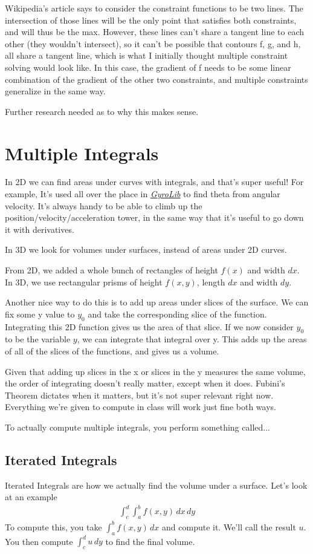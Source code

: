 \documentclass[12pt, letterpaper]{article}
\newcommand{\externalLink}[2]{\emph{\underline{\href{#1}{#2}}}}
\begin{document}
Wikipedia's article says to consider the constraint functions to be two lines.
The intersection of those lines will be the only point that satisfies both constraints, and will thus be the max.
However, these lines can't share a tangent line to each other (they wouldn't intersect), so it can't be possible that contours f, g, and h, all share a tangent line, which is what I initially thought multiple constraint solving would look like.
In this case, the gradient of f needs to be some linear combination of the gradient of the other two constraints, and multiple constraints generalize in the same way.

Further research needed as to why this makes sense.

\section{Multiple Integrals}
In 2D we can find areas under curves with integrals, and that's super useful!
For example, It's used all over the place in \externalLink{https://github.com/SAXTEN2011/GyroLib2020}{GyroLib} to find theta from angular velocity.
It's always handy to be able to climb up the position/velocity/acceleration tower, in the same way that it's useful to go down it with derivatives.

In 3D we look for volumes under surfaces, instead of areas under 2D curves.

From 2D, we added a whole bunch of rectangles of height $f(x)$ and width $dx$. 
In 3D, we use rectangular prisms of height $f(x, y)$, length $dx$ and width $dy$.

Another nice way to do this is to add up areas under slices of the surface. 
We can fix some y value to $y_0$ and take the corresponding slice of the function.
Integrating this 2D function gives us the area of that slice.
If we now consider $y_0$ to be the variable $y$, we can integrate that integral over y.
This adds up the areas of all of the slices of the functions, and gives us a volume.

Given that adding up slices in the x or slices in the y measures the same volume, the order of integrating doesn't really matter, except when it does.
Fubini's Theorem dictates when it matters, but it's not super relevant right now.
Everything we're given to compute in class will work just fine both ways.

To actually compute multiple integrals, you perform something called...
\subsection{Iterated Integrals}
Iterated Integrals are how we actually find the volume under a surface.
Let's look at an example
\begin{gather*}
    \int_c^d \int_a^b f(x, y) \,dx\,dy
\end{gather*}
To compute this, you take $\int_a^b f(x, y) \,dx$ and compute it. We'll call the result $u$.
You then compute $\int_c^d u\,dy$ to find the final volume.
\end{document}
